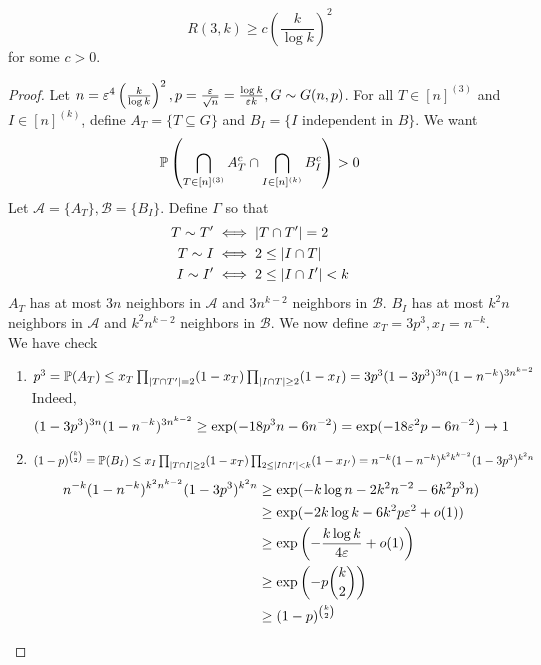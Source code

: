 \documentclass{article}
\begin{document}
\begin{thm}[Erd\H os, 1961]
  $$R(3, k) \ge c\left(\frac k{\log k}\right)^2$$
  for some $c > 0$.
\end{thm}
\begin{proof}
  Let $n = \varepsilon^4\left(\frac k{\log k}\right)^2, p = \frac{\varepsilon}{\sqrt n} = \frac{\log k}{\varepsilon k}, G \sim G(n, p)$. For all $T \in [n]^{(3)}$ and $I \in [n]^{(k)}$, define $A_T = \{T \subseteq G\}$ and $B_I = \{I \text{ independent in }B\}$. We want
  $$\mathbb P\left(\bigcap_{T \in [n]^{(3)}} A_T^c \cap \bigcap_{I \in [n]^{(k)}} B_I^c\right) > 0$$
  Let $\mathcal A = \{A_T\}, \mathcal B = \{B_I\}$. Define $\Gamma$ so that \begin{align*}
    T \sim T' & \iff \left\lvert T \cap T'\right\rvert = 2 \\
    T \sim I & \iff 2 \le \left\lvert I \cap T\right\rvert \\
    I \sim I' & \iff 2 \le \left\lvert I \cap I'\right\rvert < k
  \end{align*}
  $A_T$ has at most $3n$ neighbors in $\mathcal A$ and $3n^{k - 2}$ neighbors in $\mathcal B$. $B_I$ has at most $k^2n$ neighbors in $\mathcal A$ and $k^2n^{k - 2}$ neighbors in $\mathcal B$. We now define $x_T = 3p^3, x_I = n^{-k}$. We have check
  \begin{enumerate}
    \item $p^3 = \mathbb P(A_T) \le x_T \prod_{\left\lvert T \cap T'\right\rvert = 2} (1 - x_T) \prod_{\left\lvert I \cap T\right\rvert \ge 2} (1 - x_I) = 3p^3 (1 - 3p^3)^{3n}(1 - n^{-k})^{3n^{k - 2}}$
    Indeed,
    $$(1 - 3p^3)^{3n}(1 - n^{-k})^{3n^{k - 2}} \ge \exp(-18p^3n - 6n^{-2}) = \exp(-18\varepsilon^2 p - 6n^{-2}) \to 1$$

\newlec

    \item $(1 - p)^{\binom k2} = \mathbb P(B_I) \le x_I \prod_{\left\lvert T \cap I\right\rvert \ge 2}(1 - x_T) \prod_{2 \le \left\lvert I \cap I'\right\rvert < k} (1 - x_{I'}) = n^{-k}(1 - n^{-k})^{k^2k^{k - 2}}(1 - 3p^3)^{k^2n}$
    \begin{align*}
      n^{-k}(1 - n^{-k})^{k^2n^{k - 2}}(1 - 3p^3)^{k^2n}
      & \ge \exp(-k\log n - 2k^2n^{-2} - 6k^2p^3n) \\
      & \ge \exp(-2k\log k - 6k^2p\varepsilon^2 + o(1)) \\
      & \ge \exp\left(-\frac{k\log k}{4\varepsilon} + o(1)\right) \\
      & \ge \exp\left(-p\binom k2\right) \\
      & \ge (1 - p)^{\binom k2}
    \end{align*}
  \end{enumerate}
\end{proof}
\end{document}
